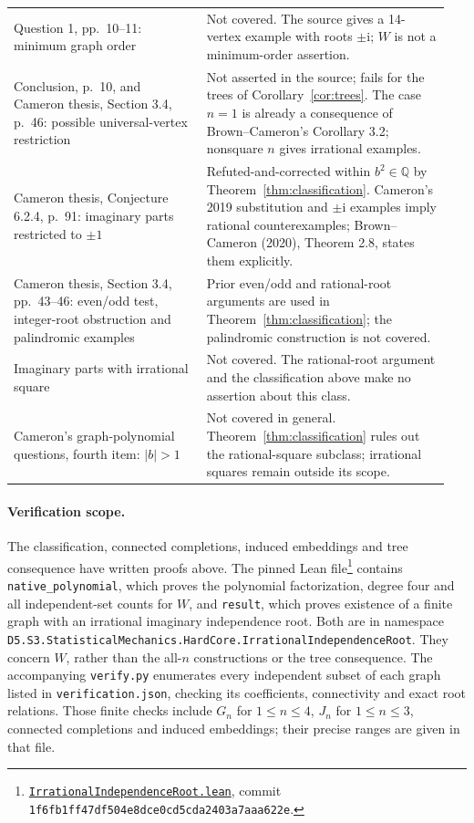 \documentclass[11pt]{article}
\newcommand{\ii}{\mathrm{i}}
\begin{document}
\begin{longtable}{@{}p{0.42\linewidth}p{0.53\linewidth}@{}}
Question 1, pp.~10--11: minimum graph order
 & Not covered. The source gives a 14-vertex example with roots $\pm\ii$;
 $W$ is not a minimum-order assertion.\\[4pt]
Conclusion, p.~10, and Cameron thesis, Section 3.4, p.~46:
 possible universal-vertex restriction
 & Not asserted in the source; fails for the trees of
 Corollary~\ref{cor:trees}. The case $n=1$ is already a consequence of
 Brown--Cameron's Corollary 3.2; nonsquare $n$ gives irrational examples.\\[4pt]
Cameron thesis, Conjecture 6.2.4, p.~91: imaginary parts restricted to $\pm1$
 & Refuted-and-corrected within $b^2\in\mathbb Q$ by
 Theorem~\ref{thm:classification}. Cameron's 2019 substitution and
 $\pm\ii$ examples imply rational counterexamples; Brown--Cameron
 (2020), Theorem 2.8, states them explicitly.\\[4pt]
Cameron thesis, Section 3.4, pp.~43--46: even/odd test, integer-root
 obstruction and palindromic examples
 & Prior even/odd and rational-root arguments are used in
 Theorem~\ref{thm:classification}; the palindromic construction is not covered.\\[4pt]
Imaginary parts with irrational square
 & Not covered. The rational-root argument and the classification above
 make no assertion about this class.\\
Cameron's graph-polynomial questions, fourth item: $|b|>1$
 & Not covered in general. Theorem~\ref{thm:classification} rules out the
 rational-square subclass; irrational squares remain outside its scope.\\
\end{longtable}
\normalsize

\paragraph{Verification scope.}
The classification, connected completions, induced embeddings and tree
consequence have written proofs above. The pinned Lean
file\footnote{\href{https://github.com/the-omega-institute/trureturing/blob/1f6fb1ff47df504e8dce0cd5cda2403a7aaa622e/D5/S3/StatisticalMechanics/HardCore/IrrationalIndependenceRoot.lean}{\texttt{IrrationalIndependenceRoot.lean}},
commit \texttt{1f6fb1ff47df504e8dce0cd5cda2403a7aaa622e}.}
contains \texttt{native\_polynomial}, which proves the polynomial
factorization, degree four and all independent-set counts for $W$, and
\texttt{result}, which proves existence of a finite graph with an irrational
imaginary independence root. Both are in namespace
\texttt{D5.S3.StatisticalMechanics.HardCore.IrrationalIndependenceRoot}.
They concern $W$, rather than the all-$n$ constructions or the tree consequence.
The accompanying \texttt{verify.py} enumerates every independent subset
of each graph listed in \texttt{verification.json}, checking its coefficients,
connectivity and exact root relations. Those finite checks include
$G_n$ for $1\leq n\leq4$, $J_n$ for $1\leq n\leq3$, connected completions
and induced embeddings; their precise ranges are given in that file.
\end{document}
